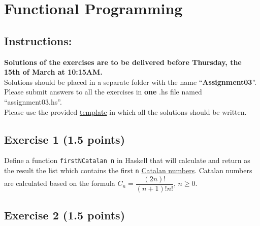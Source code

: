 \documentclass [11pt, a4wide, twoside]{article}
\begin{document}
\section*{\space{} Functional Programming}


\subsection*{Instructions:}

\textbf{Solutions of the exercises are to be delivered before Thursday, the 15th of March at 10:15AM.}\\
Solutions should be placed in a separate folder with the name ``\textbf{Assignment03}''.\\
Please submit answers to all the exercises in \textbf{one} .hs file named ``assignment03.hs''.\\
Please use the provided \href{http://scg.unibe.ch/download/lectures/pl2018-exercises/assignment03.hs}{template} in which all the solutions should be written.

\subsection*{Exercise 1 (1.5 points)}

Define a function \texttt{firstNCatalan n} in Haskell that will calculate and return as the result the list which contains the first \texttt{n} \href{https://en.wikipedia.org/wiki/Catalan_number}{Catalan numbers}. Catalan numbers are calculated based on the formula \mbox{$C_{n} = \dfrac{(2n)!}{(n+1)!n!}$,} $n \ge 0$.

\vspace{0.2cm}

\subsection*{Exercise 2 (1.5 points)}
\end{document}
